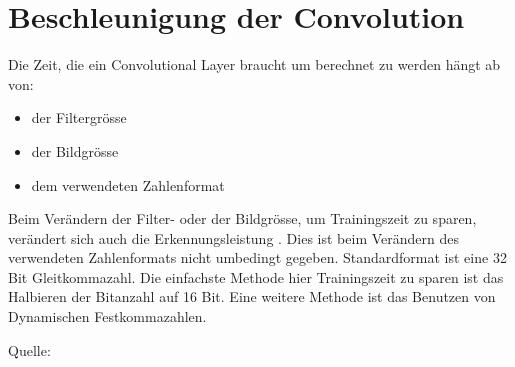 \chapter{Beschleunigung der Convolution}

Die Zeit, die ein Convolutional Layer braucht um berechnet zu werden hängt ab von:
\begin{itemize}
 \item der Filtergr\"osse
 \item der Bildgr\"osse
 \item dem verwendeten Zahlenformat
\end{itemize}
Beim Verändern der Filter- oder der Bildgr\"osse, um Trainingszeit zu sparen, ver\"andert sich auch die Erkennungsleistung . Dies ist beim Verändern des verwendeten Zahlenformats nicht umbedingt gegeben. Standardformat ist eine 32 Bit Gleitkommazahl. Die einfachste Methode hier Trainingszeit zu sparen ist das Halbieren der Bitanzahl auf 16 Bit. Eine weitere Methode ist das Benutzen von Dynamischen Festkommazahlen.



Quelle: \cite{FPGpu}
